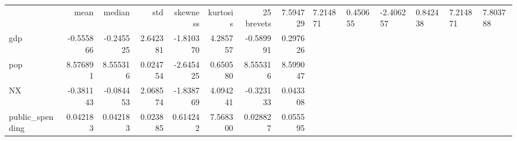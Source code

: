 \begin{tabular}{lrrrrrrr}
\toprule
 & mean & median & std & skewness & kurtosis & 25%
\midrule
brevets & 7.594729 & 7.214871 & 0.450655 & -2.406257 & 0.842438 & 7.214871 & 7.803788 \\
gdp & -0.555866 & -0.245525 & 2.642381 & -1.810370 & 4.285757 & -0.589991 & 0.297626 \\
pop & 8.576891 & 8.555316 & 0.024754 & -2.645425 & 0.650580 & 8.555316 & 8.599047 \\
NX & -0.381143 & -0.084453 & 2.068574 & -1.838769 & 4.094241 & -0.323133 & 0.043308 \\
public_spending & 0.042183 & 0.042183 & 0.023885 & 0.614242 & 7.568300 & 0.028827 & 0.055595 \\
\bottomrule
\end{tabular}
